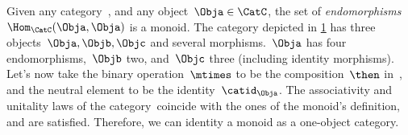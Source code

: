 \begin{example}
  Given any category~\CatC, and any object~$\Obja\in \CatC$, the set of \emph{endomorphisms}~$\Hom_{\CatC}(\Obja,\Obja)$ is a monoid. The category depicted in \cref{fig:monoid_endomorphisms} has three objects~$\Obja,\Objb,\Objc$ and several morphisms.~$\Obja$ has four endomorphisms,~$\Objb$ two, and~$\Objc$ three (including identity morphisms). Let's now take the binary operation~$\mtimes$ to be the composition~$\then$ in~\CatC, and the neutral element to be the identity~$\catid_\Obja$. The associativity and unitality laws of the category~\CatC coincide with the ones of the monoid's definition, and are satisfied. Therefore, we can identity a monoid as a one-object category.
\end{example}

\begin{figure}[h!]
  \begin{center}
    \caption{}
    \label{fig:monoid_endomorphisms}
  \end{center}
\end{figure}



